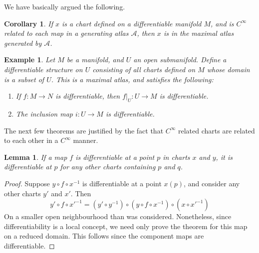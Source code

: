 \documentclass[12pt]{report}
\theoremstyle{plain}
\newtheorem{lemma}[theorem]{Lemma}
\newtheorem{corollary}[theorem]{Corollary}
\newtheorem*{example}{Example}
\theoremstyle{definition}
\begin{document}
We have basically argued the following.

\begin{corollary}
    If $x$ is a chart defined on a differentiable manifold $M$, and is $C^\infty$ related to each map in a generating atlas $\mathcal{A}$, then $x$ is in the maximal atlas generated by $\mathcal{A}$.
\end{corollary}

\begin{example}
    Let $M$ be a manifold, and $U$ an open submanifold. Define a differentiable structure on $U$ consisting of all charts defined on $M$ whose domain is a subset of $U$. This is a maximal atlas, and satisfies the following:
    \begin{enumerate}
        \item If $f: M \to N$ is differentiable, then $f|_U: U \to M$ is differentiable.
        \item The inclusion map $i:U \to M$ is differentiable.
    \end{enumerate}
\end{example}

The next few theorems are justified by the fact that $C^\infty$ related charts are related to each other in a $C^\infty$ manner.

\begin{lemma}
    If a map $f$ is differentiable at a point $p$ in charts $x$ and $y$, it is differentiable at $p$ for any other charts containing $p$ and $q$.
\end{lemma}
\begin{proof}
    Suppose $y \circ f \circ x^{-1}$ is differentiable at a point $x(p)$, and consider any other charts $y'$ and $x'$. Then
    \[ y' \circ f \circ x'^{-1} = (y' \circ y^{-1}) \circ (y \circ f \circ x^{-1}) \circ (x \circ x'^{-1}) \]
    On a smaller open neighbourhood than was considered. Nonetheless, since differentiability is a local concept, we need only prove the theorem for this map on a reduced domain. This follows since the component maps are differentiable.
\end{proof}
\end{document}
